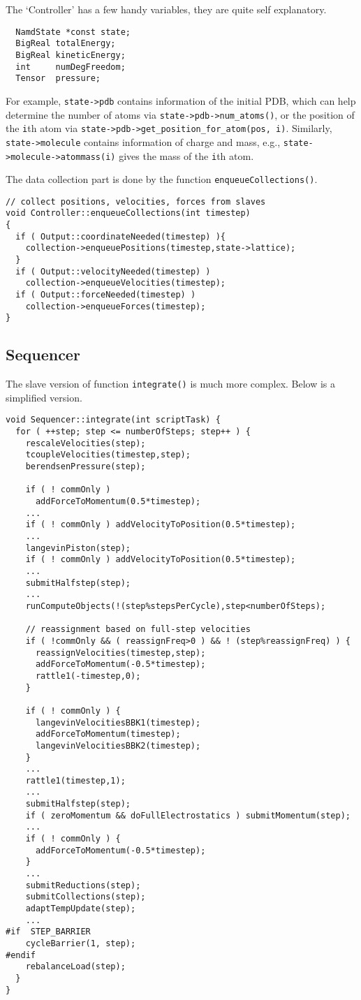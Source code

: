 \documentclass{article}
\begin{document}
The `Controller' has a few handy variables,
they are quite self explanatory.
\begin{lstlisting}
  NamdState *const state;
  BigReal totalEnergy;
  BigReal kineticEnergy;
  int     numDegFreedom;
  Tensor  pressure;
\end{lstlisting}
%
For example, \texttt{state->pdb} contains information
of the initial PDB, which can help determine the number of atoms
via \texttt{state->pdb->num\_atoms()}, or the position of the \texttt{i}th atom
via \texttt{state->pdb->get\_position\_for\_atom(pos, i)}.
Similarly, \texttt{state->molecule} contains information of charge and mass,
e.g., \texttt{state->molecule->atommass(i)} gives the mass
of the \texttt{i}th atom.

The data collection part is done by the function
\texttt{enqueueCollections()}.

\begin{lstlisting}
// collect positions, velocities, forces from slaves
void Controller::enqueueCollections(int timestep)
{
  if ( Output::coordinateNeeded(timestep) ){
    collection->enqueuePositions(timestep,state->lattice);
  }
  if ( Output::velocityNeeded(timestep) )
    collection->enqueueVelocities(timestep);
  if ( Output::forceNeeded(timestep) )
    collection->enqueueForces(timestep);
}
\end{lstlisting}


\subsection{Sequencer}

The slave version of function \texttt{integrate()}
is much more complex.  Below is a simplified version.

\begin{lstlisting}
void Sequencer::integrate(int scriptTask) {
  for ( ++step; step <= numberOfSteps; step++ ) {
    rescaleVelocities(step);
    tcoupleVelocities(timestep,step);
    berendsenPressure(step);

    if ( ! commOnly )
      addForceToMomentum(0.5*timestep);
    ...
    if ( ! commOnly ) addVelocityToPosition(0.5*timestep);
    ...
    langevinPiston(step);
    if ( ! commOnly ) addVelocityToPosition(0.5*timestep);
    ...
    submitHalfstep(step);
    ...
    runComputeObjects(!(step%stepsPerCycle),step<numberOfSteps);

    // reassignment based on full-step velocities
    if ( !commOnly && ( reassignFreq>0 ) && ! (step%reassignFreq) ) {
      reassignVelocities(timestep,step);
      addForceToMomentum(-0.5*timestep);
      rattle1(-timestep,0);
    }

    if ( ! commOnly ) {
      langevinVelocitiesBBK1(timestep);
      addForceToMomentum(timestep);
      langevinVelocitiesBBK2(timestep);
    }
    ...
    rattle1(timestep,1);
    ...
    submitHalfstep(step);
    if ( zeroMomentum && doFullElectrostatics ) submitMomentum(step);
    ...
    if ( ! commOnly ) {
      addForceToMomentum(-0.5*timestep);
    }
    ...
    submitReductions(step);
    submitCollections(step);
    adaptTempUpdate(step);
    ...
#if  STEP_BARRIER
    cycleBarrier(1, step);
#endif
    rebalanceLoad(step);
  }
}
\end{lstlisting}
\end{document}
